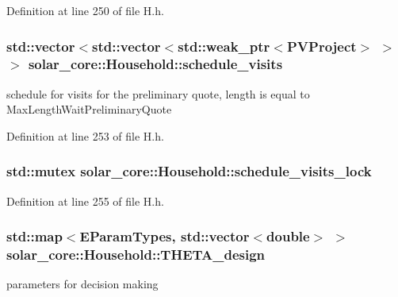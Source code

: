 Definition at line 250 of file H.\+h.

\hypertarget{classsolar__core_1_1_household_aadd4e3e2fc66ed214bcfadf37f557b14}{}
\subsubsection[{schedule\+\_\+visits}]{\setlength{\rightskip}{0pt plus 5cm}std\+::vector$<$std\+::vector$<$std\+::weak\+\_\+ptr$<${\bf P\+V\+Project}$>$ $>$ $>$ solar\+\_\+core\+::\+Household\+::schedule\+\_\+visits\hspace{0.3cm}{\ttfamily [protected]}}\label{classsolar__core_1_1_household_aadd4e3e2fc66ed214bcfadf37f557b14}
schedule for visits for the preliminary quote, length is equal to Max\+Length\+Wait\+Preliminary\+Quote 

Definition at line 253 of file H.\+h.

\hypertarget{classsolar__core_1_1_household_a15e598cfc419040a23f75fe08a8ef1d8}{}
\subsubsection[{schedule\+\_\+visits\+\_\+lock}]{\setlength{\rightskip}{0pt plus 5cm}std\+::mutex solar\+\_\+core\+::\+Household\+::schedule\+\_\+visits\+\_\+lock\hspace{0.3cm}{\ttfamily [protected]}}\label{classsolar__core_1_1_household_a15e598cfc419040a23f75fe08a8ef1d8}


Definition at line 255 of file H.\+h.

\hypertarget{classsolar__core_1_1_household_a7c0f5fb9f84a1d971e770fc677e7d8de}{}
\subsubsection[{T\+H\+E\+T\+A\+\_\+design}]{\setlength{\rightskip}{0pt plus 5cm}std\+::map$<${\bf E\+Param\+Types}, std\+::vector$<$double$>$ $>$ solar\+\_\+core\+::\+Household\+::\+T\+H\+E\+T\+A\+\_\+design\hspace{0.3cm}{\ttfamily [protected]}}\label{classsolar__core_1_1_household_a7c0f5fb9f84a1d971e770fc677e7d8de}
parameters for decision making 

